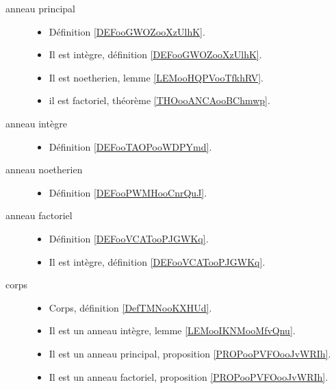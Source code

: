 \begin{description}
	\item[anneau principal]\hspace{1cm}
	\begin{itemize}
		\item
		      Définition \ref{DEFooGWOZooXzUlhK}.
		\item
		      Il est intègre, définition \ref{DEFooGWOZooXzUlhK}.
		\item
		      Il est noetherien, lemme \ref{LEMooHQPVooTfkhRV}.
		\item
		      il est factoriel, théorème \ref{THOooANCAooBChmwp}.
	\end{itemize}
	\item[anneau intègre]\hspace{1cm}
	\begin{itemize}
		\item
		      Définition \ref{DEFooTAOPooWDPYmd}.
	\end{itemize}
	\item[anneau noetherien]\hspace{1cm}
	\begin{itemize}
		\item
		      Définition \ref{DEFooPWMHooCnrQuJ}.
	\end{itemize}
	\item[anneau factoriel]\hspace{1cm}
	\begin{itemize}
		\item
		      Définition \ref{DEFooVCATooPJGWKq}.
		\item
		      Il est intègre, définition \ref{DEFooVCATooPJGWKq}.
	\end{itemize}
	\item[corps]\hspace{1cm}
	\begin{itemize}
		\item
		      Corps, définition \ref{DefTMNooKXHUd}.
		\item
		      Il est un anneau intègre, lemme \ref{LEMooIKNMooMfvQnu}.
		\item
		      Il est un anneau principal, proposition \ref{PROPooPVFOooJvWRIh}.
		\item
		      Il est un anneau factoriel, proposition \ref{PROPooPVFOooJvWRIh}.
	\end{itemize}
\end{description}

